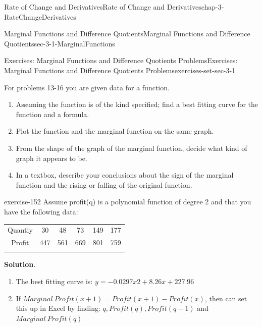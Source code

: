 \documentclass[oneside,10pt,]{book}
\numberwithin{equation}{section}
\newcommand{\hrulethin}  {\noalign{\hrule height 0.04em}}
\newcommand{\hrulethick} {\noalign{\hrule height 0.11em}}
\begin{document}
\begin{chapterptx}{Rate of Change and Derivatives}{}{Rate of Change and Derivatives}{}{}{chap-3-RateChangeDerivatives}
\begin{sectionptx}{Marginal Functions and Difference Quotients}{}{Marginal Functions and Difference Quotients}{}{}{sec-3-1-MarginalFunctions}
\begin{exercises-subsection-numberless}{Exercises: Marginal Functions and Difference Quotients Problems}{}{Exercises: Marginal Functions and Difference Quotients Problems}{}{}{exercises-set-sec-3-1}
\begin{exercisegroup}
\end{exercisegroup}
\par\medskip\noindent
\par\medskip\noindent%
\hypertarget{exercisegroup-14}{}%
\hypertarget{p-990}{}%
For problems 13-16 you are given data for a function.%
\leavevmode%
\begin{enumerate}[label=(\alph*)]
\item\hypertarget{li-303}{}\hypertarget{p-991}{}%
Assuming the function is of the kind specified; find a best fitting curve for the function and a formula.%
\item\hypertarget{li-304}{}\hypertarget{p-992}{}%
Plot the function and the marginal function on the same graph.%
\item\hypertarget{li-305}{}\hypertarget{p-993}{}%
From the shape of the graph of the marginal function, decide what kind of graph it appears to be.%
\item\hypertarget{li-306}{}\hypertarget{p-994}{}%
In a textbox, describe your conclusions about the sign of the marginal function and the rising or falling of the original function.%
\end{enumerate}
\begin{exercisegroup}
\begin{divisionexerciseeg}{13}{}{}{exercise-152}%
\hypertarget{p-995}{}%
Assume profit(q) is a polynomial function of degree 2 and that you have the following data:%
\begin{sidebyside}{1}{0}{0}{0}%
\begin{sbspanel}{1}%
{\centering%
\begin{tabular}{cccccc}\hrulethick
Quantiy&30&48&73&149&177\tabularnewline\hrulethin
Profit&447&561&669&801&759\tabularnewline\hrulethin
\end{tabular}
\par}
\end{sbspanel}%
\end{sidebyside}%
\par\smallskip%
\noindent\textbf{Solution}.\hypertarget{solution-74}{}\quad%
\leavevmode%
\begin{enumerate}[label=(\alph*)]
\item\hypertarget{li-307}{}\hypertarget{p-996}{}%
The best fitting curve is:   \(y = -0.0297x2 + 8.26x + 227.96\)%
\item\hypertarget{li-308}{}\hypertarget{p-997}{}%
If  \(Marginal\ Profit(x+1)=Profit(x+1)-Profit(x)\), then can set this up in Excel by finding: \(q, Profit (q), Profit(q-1)\) and \(Marginal\ Profit (q)\)%

\end{enumerate}
\end{divisionexerciseeg}
\end{exercisegroup}
\end{exercises-subsection-numberless}
\end{sectionptx}
\end{chapterptx}
\end{document}
